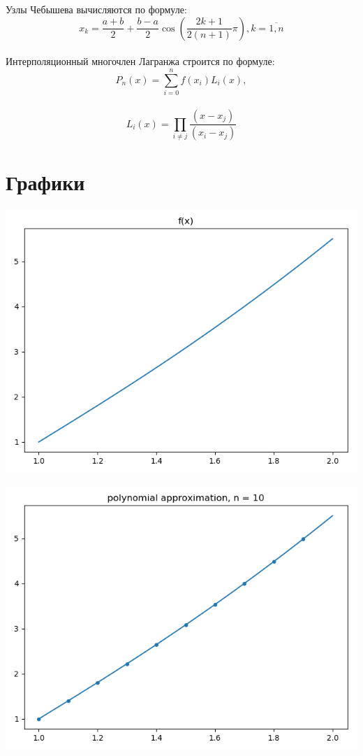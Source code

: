 \documentclass{article}
\begin{document}
Узлы Чебышева вычисляются по формуле:
\begin{equation}
\label{eq:node}
x_k = \dfrac{a+b}{2} + \dfrac{b-a}{2} \cos{\left(\dfrac{2k+1}{2(n+1)} \pi\right)}, k = \overline{1, n} 
\end{equation} \\

Интерполяционный многочлен Лагранжа строится по формуле:
\begin{equation}
\label{eq:lagrang}
P_n(x) = \sum_{i=0}^{n}f(x_i) L_i(x), 
\end{equation}\\
$$L_i(x) = \prod_{i\neq j} \frac{(x-x_j)}{(x_i-x_j)}$$

\section{Графики}

\includegraphics[scale=0.5]{f(x).png}

\includegraphics[scale=0.5]{10.png}
\end{document}
